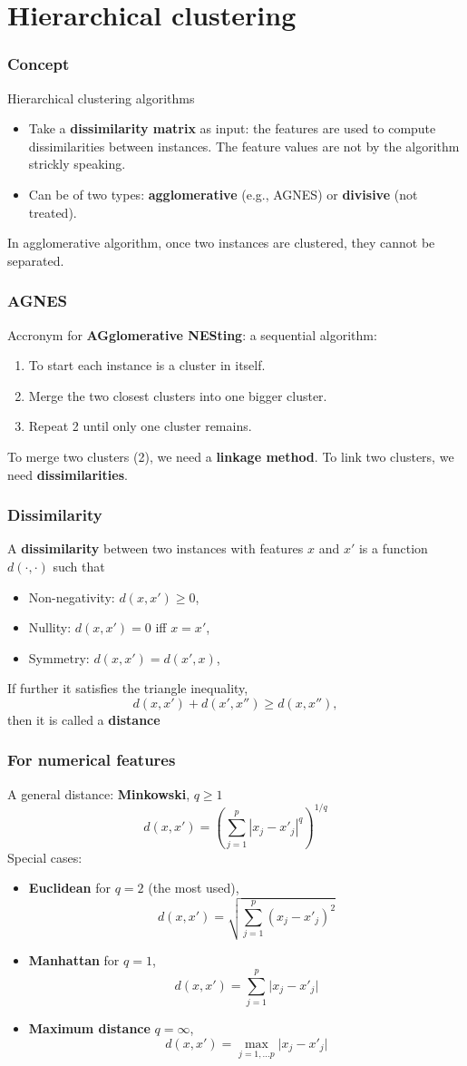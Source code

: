 \section{Hierarchical clustering}
\begin{frame}
\frametitle{Concept}
Hierarchical clustering algorithms
\begin{itemize}
\item Take a {\bf dissimilarity matrix} as input: the features are used to compute dissimilarities between instances. The feature values are not by the algorithm strickly speaking.  
\item Can be of two types: {\bf agglomerative} (e.g., AGNES) or {\bf divisive} (not treated).
\end{itemize}
In agglomerative algorithm, once two instances are clustered, they cannot be separated.
\end{frame}
\begin{frame}
\frametitle{AGNES}
Accronym for {\bf AGglomerative NESting}: a sequential algorithm:
\begin{enumerate}
\item To start each instance is a cluster in itself.
\item Merge the two closest clusters into one bigger cluster.
\item Repeat 2 until only one cluster remains.
\end{enumerate}
To merge two clusters (2), we need a {\bf linkage method}. To link two clusters, we need {\bf dissimilarities}.
\end{frame}
\begin{frame}
\frametitle{Dissimilarity}
A {\bf dissimilarity} between two instances with features $x$ and $x'$ is a function $d(\cdot, \cdot)$ such that
\begin{itemize}
\item Non-negativity: $d(x,x')\geq 0$,
\item Nullity: $d(x,x') = 0$ iff $x=x'$,
\item Symmetry: $d(x,x') = d(x',x)$,
\end{itemize}
If further it satisfies the triangle inequality,
$$
d(x, x') + d(x', x'') \geq d(x, x''),
$$
then it is called a {\bf distance}
\end{frame}
\begin{frame}
\frametitle{For numerical features}
A general distance: {\bf Minkowski}, $q \geq 1$
$$
d(x,x') = \left(\sum_{j=1}^p |x_j - x'_j|^q\right)^{1/q}
$$
\scriptsize
Special cases:
\begin{itemize}
\item {\bf Euclidean} for $q=2$ (the most used),
$$
d(x,x') = \sqrt{\sum_{j=1}^p (x_{j} - x'_{j})^2}
$$
\item {\bf Manhattan} for $q=1$,
$$
d(x,x') = \sum_{j=1}^p \vert x_j - x'_j \vert
$$
\item {\bf Maximum distance} $q=\infty$,
$$
d(x,x') = \max_{j=1,\ldots p} \vert x_j - x'_j\vert
$$
\end{itemize}
\normalsize
\end{frame}

